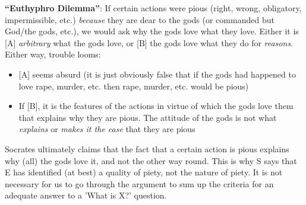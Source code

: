 \documentclass[oneside]{article}
\begin{document}
\noindent \textbf{``Euthyphro Dilemma''}: If certain actions were pious (right, wrong, obligatory, impermissible, etc.) \emph{because} they are dear to the gods (or commanded but God/the gods, etc.), we would ask why the gods love what they love. Either it is [A] \emph{arbitrary} what the gods love, or [B] the gods love what they do for \emph{reasons}. Either way, trouble looms:\begin{itemize}\item{[A] seems absurd (it is just obviously false that if the gods had happened to love rape, murder, etc. then rape, murder, etc. would be pious)}\item{If [B], it is the features of the actions in virtue of which the gods love them that explains why they are pious. The attitude of the gods is not what \emph{explains} or \emph{makes it the case} that they are pious\\} \end{itemize} 


\noindent Socrates ultimately claims that the fact that a certain action is pious explains why (all) the gods love it, and not the other way round. This is why S says that E has identified (at best) a quality of piety, not the nature of piety. It is not necessary for us to go through the argument to sum up the criteria for an adequate answer to a 'What is X?' question. 


\end{document}
